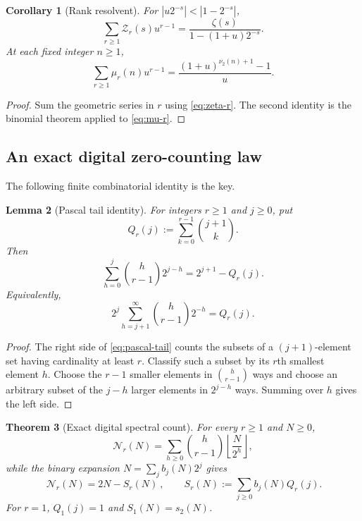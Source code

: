 \documentclass[11pt,a4paper]{article}
\theoremstyle{frontier}
\newtheorem{theorem}{Theorem}[section]
\newtheorem{lemma}[theorem]{Lemma}
\newtheorem{corollary}[theorem]{Corollary}
\theoremstyle{definition}
\newcommand{\floor}[1]{\left\lfloor #1\right\rfloor}
\begin{document}
\begin{corollary}[Rank resolvent]\label{cor:rank-resolvent}
For $|u2^{-s}|<|1-2^{-s}|$,
\begin{equation}\label{eq:rank-resolvent}
 \sum_{r\ge1}\mathcal Z_r(s)u^{r-1}
 =\frac{\zeta(s)}{1-(1+u)2^{-s}}.
\end{equation}
At each fixed integer $n\ge1$,
\begin{equation}\label{eq:mu-rank-gen}
 \sum_{r\ge1}\mu_r(n)u^{r-1}
 =\frac{(1+u)^{\nu_2(n)+1}-1}{u}.
\end{equation}
\end{corollary}

\begin{proof}
Sum the geometric series in $r$ using \eqref{eq:zeta-r}.  The second identity is the binomial theorem applied to \eqref{eq:mu-r}.
\end{proof}

\subsection{An exact digital zero-counting law}

The following finite combinatorial identity is the key.

\begin{lemma}[Pascal tail identity]\label{lem:pascal-tail}
For integers $r\ge1$ and $j\ge0$, put
\begin{equation}\label{eq:Qr}
  Q_r(j):=\sum_{k=0}^{r-1}\binom{j+1}{k}.
\end{equation}
Then
\begin{equation}\label{eq:pascal-tail}
 \sum_{h=0}^{j}\binom h{r-1}2^{j-h}=2^{j+1}-Q_r(j).
\end{equation}
Equivalently,
\[
 2^j\sum_{h=j+1}^{\infty}\binom h{r-1}2^{-h}=Q_r(j).
\]
\end{lemma}

\begin{proof}
The right side of \eqref{eq:pascal-tail} counts the subsets of a $(j+1)$-element set having cardinality at least $r$.  Classify such a subset by its $r$th smallest element $h$.  Choose the $r-1$ smaller elements in $\binom h{r-1}$ ways and choose an arbitrary subset of the $j-h$ larger elements in $2^{j-h}$ ways.  Summing over $h$ gives the left side.
\end{proof}

\begin{theorem}[Exact digital spectral count]\label{thm:digital-count}
For every $r\ge1$ and $N\ge0$,
\begin{equation}\label{eq:Nr-floor}
  \mathcal N_r(N)=\sum_{h\ge0}\binom h{r-1}\floor{\frac N{2^h}},
\end{equation}
while the binary expansion $N=\sum_jb_j(N)2^j$ gives
\begin{equation}\label{eq:Nr-digital}
  \boxed{\ \mathcal N_r(N)=2N-S_r(N)\ },
  \qquad
  S_r(N):=\sum_{j\ge0}b_j(N)Q_r(j).
\end{equation}
For $r=1$, $Q_1(j)=1$ and $S_1(N)=s_2(N)$.
\end{theorem}
\end{document}

